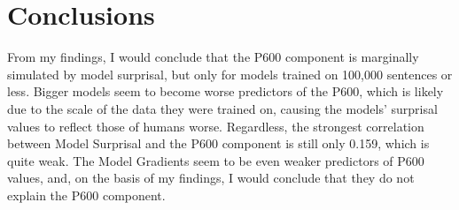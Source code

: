 \documentclass{IEEEtran}
\begin{document}
\section{Conclusions}
From my findings, I would conclude that the P600 component is marginally simulated by model surprisal, but only for models trained on 100,000 sentences or less.
Bigger models seem to become worse predictors of the P600, which is likely due to the scale of the data they were trained on, causing the models' surprisal values to reflect those of humans worse.
Regardless, the strongest correlation between Model Surprisal and the P600 component is still only 0.159, which is quite weak.
The Model Gradients seem to be even weaker predictors of P600 values, and, on the basis of my findings, I would conclude that they do not explain the P600 component.



\onecolumn
\appendix
\end{document}
